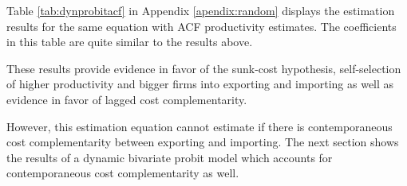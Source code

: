 \documentclass[12pt]{article}
\begin{document}
Table \ref{tab:dynprobitacf} in Appendix \ref{apendix:random} displays the estimation results for the same
equation with ACF productivity estimates. The coefficients in this
table are quite similar to the results above. 

These results provide evidence in favor of  the sunk-cost hypothesis,
self-selection of higher productivity and bigger firms into
exporting and importing as well as evidence in favor of lagged cost
complementarity.
 
However, this estimation equation cannot estimate if there is  contemporaneous cost complementarity between exporting
and importing. The next section shows the results of a dynamic
bivariate probit model which accounts for contemporaneous cost complementarity
as well. 


  
% 
% 
\end{document}
